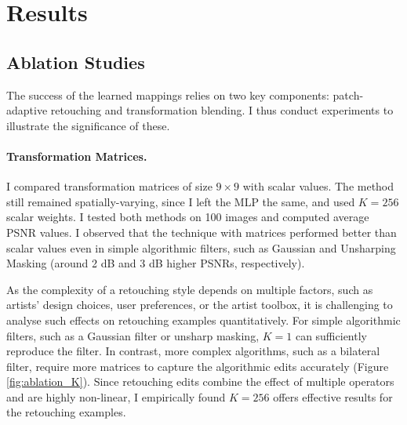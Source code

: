\section{Results}
\label{sec:results}


\subsection{Ablation Studies}\label{ablation}
The success of the learned mappings relies on two key components: patch-adaptive retouching and transformation blending. I thus conduct experiments to illustrate the significance of these.

\paragraph{Transformation Matrices.} I compared transformation matrices of size $9 \times 9$ with scalar values. The method still remained spatially-varying, since I left the MLP the same, and used $K=256$ scalar weights. I tested both methods on 100 images and computed average PSNR values. I observed that the technique with matrices performed better than scalar values even in simple algorithmic filters, such as Gaussian and Unsharping Masking (around 2 dB and 3 dB higher PSNRs, respectively). 

As the complexity of a retouching style depends on multiple factors, such as artists’ design choices, user preferences, or the artist toolbox, it is challenging to analyse such effects on retouching examples quantitatively. For simple algorithmic filters, such as a Gaussian filter or unsharp masking, $K=1$ can sufficiently reproduce the filter. In contrast, more complex algorithms, such as a bilateral filter, require more matrices to capture the algorithmic edits accurately (Figure \ref{fig:ablation_K}). Since retouching edits combine the effect of multiple operators and are highly non-linear, I empirically found $K=256$ offers effective results for the retouching examples. 

